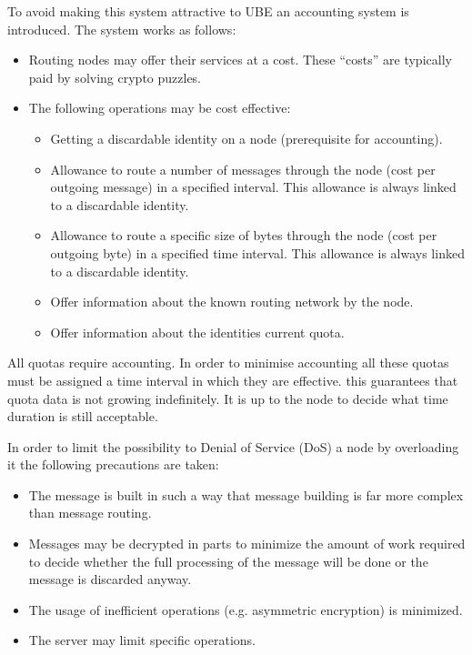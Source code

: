 To avoid making this system attractive to UBE an accounting system is introduced. The system works as follows:
\begin{itemize}
	\item Routing nodes may offer their services at a cost. These ``costs'' are typically paid by solving crypto puzzles.
	\item The following operations may be cost effective:
	\begin{itemize}
		\item Getting a discardable identity on a node (prerequisite for accounting).
		\item Allowance to route a number of messages through the node (cost per outgoing message) in a specified interval. This allowance is always linked to a discardable identity.
		\item Allowance to route a specific size of bytes through the node (cost per outgoing byte) in a specified time interval. This allowance is always linked to a discardable identity.
		\item Offer information about the known routing network by the node.
		\item Offer information about the identities current quota.
	\end{itemize}
\end{itemize}
All quotas require accounting. In order to minimise accounting all these quotas must be assigned a time interval in which they are effective. this guarantees that quota data is not growing indefinitely. It is up to the node to decide what time duration is still acceptable.

In order to limit the possibility to Denial of Service (DoS) a node by overloading it the following precautions are taken:
\begin{itemize}
	\item The message is built in such a way that message building is far more complex than message routing.
	\item Messages may be decrypted in parts to minimize the amount of work required to decide whether the full processing of the message will be done or the message is discarded anyway.
	\item The usage of inefficient operations (e.g. asymmetric encryption) is minimized.
	\item The server may limit specific operations.
\end{itemize}

